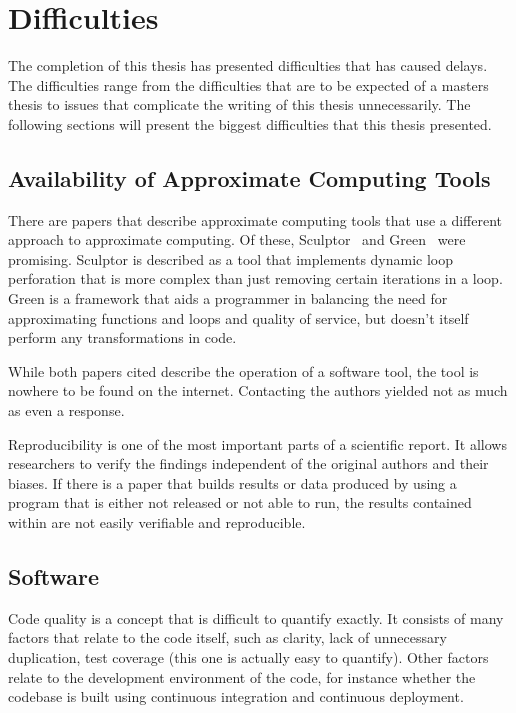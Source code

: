\section*{Difficulties}

The completion of this thesis has presented difficulties that has caused delays. The difficulties range from the difficulties that are to be expected of a masters thesis to issues that complicate the writing of this thesis unnecessarily. The following sections will present the biggest difficulties that this thesis presented. 


\subsection{Availability of Approximate Computing Tools}
There are papers that describe approximate computing tools that use a different approach to approximate computing. Of these, Sculptor~\citep{li2018sculptor} and Green~\citep{baek2010green} were promising. Sculptor is described as a tool that implements dynamic loop perforation that is more complex than just removing certain iterations in a loop. Green is a framework that aids a programmer in balancing the need for approximating functions and loops and quality of service, but doesn't itself perform any transformations in code. 

While both papers cited describe the operation of a software tool, the tool is nowhere to be found on the internet. Contacting the authors yielded not as much as even a response. 

Reproducibility is one of the most important parts of a scientific report.
It allows researchers to verify the findings independent of the original authors and their biases.
If there is a paper that builds results or data produced by using a program that is either not released or not able to run, the results contained within are not easily verifiable and reproducible.

\subsection*{Software}
Code quality is a concept that is difficult to quantify exactly.
It consists of many factors that relate to the code itself, such as clarity, lack of unnecessary duplication,
test coverage (this one is actually easy to quantify).
Other factors relate to the development environment of the code, for instance whether the codebase is built using
continuous integration and continuous deployment.

